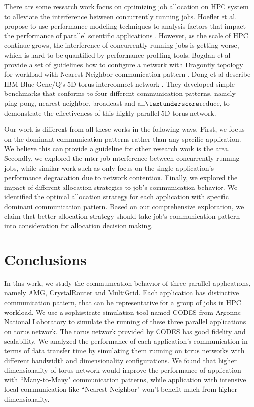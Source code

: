\documentclass[conference]{IEEEtran}
\begin{document}
There are some research work focus on optimizing job allocation on HPC system to alleviate the interference between concurrently running jobs. Hoefler et al. propose to use performance modeling techniques to analysis factors that impact the performance of parallel scientific applications \cite{hoefler-modeling}. However, as the scale of HPC continue grows, the  interference of concurrently running jobs is getting worse, which is hard to be quantified by performance profiling tools. Bogdan et al provide a set of guidelines how to configure a network with Dragonfly topology for workload with Nearest Neighbor communication pattern \cite{Bogdan-hpdc14}. Dong et al describe IBM Blue Gene/Q's 5D torus interconnect network \cite{Dong-SC11}. They developed simple benchmarks that conforms to four different communication patterns, namely ping-pong, nearest neighbor, broadcast and all$\textunderscore$reduce, to demonstrate the effectiveness of this highly parallel 5D torus network.

Our work is different from all these works in the following ways. First, we focus on the dominant communication patterns rather than any specific application. We believe this can provide a guideline for other research work is the area. Secondly, we explored the inter-job interference between concurrently running jobs, while similar work such as \cite{abhinav-sc13} only focus on the single application's performance degradation due to network contention. Finally, we explored the impact of different allocation strategies to job's communication behavior. We identified the optimal allocation strategy for each application with specific dominant communication pattern. Based on our comprehensive exploration, we claim that better allocation strategy should take job's communication pattern into consideration for allocation decision making. 

\section{Conclusions}
\label{sec:conclusion}
In this work, we study the communication behavior of three parallel applications, namely AMG, CrystalRouter and MultiGrid. Each application has distinctive communication pattern, that can be representative for a group of jobs in HPC workload. We use a sophisticate simulation tool named CODES from Argonne National Laboratory to simulate the running of these three parallel applications on torus network. The torus network provided by CODES has good fidelity and scalability. We analyzed the performance of each application's communication in terms of data transfer time by simulating them running on torus networks with different bandwidth and dimensionality configurations. We found that higher dimensionality of torus network would improve the performance of application with ``Many-to-Many" communication patterns, while application with intensive local communication like ``Nearest Neighbor" won't benefit much from higher dimensionality.
\end{document}
